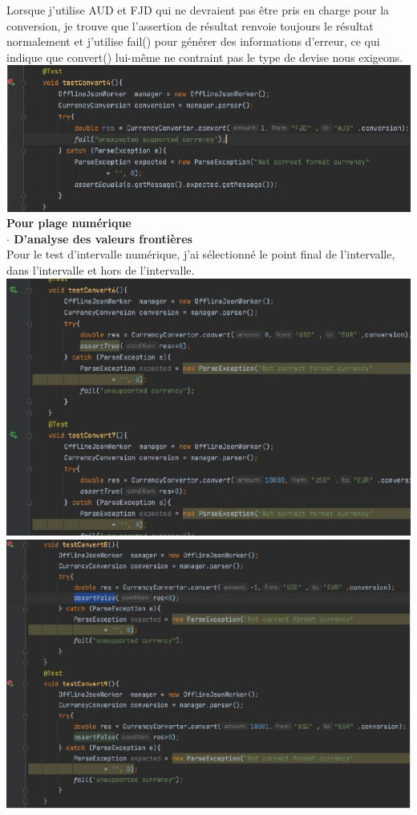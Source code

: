\documentclass{article}
\begin{document}
Lorsque j'utilise AUD et FJD qui ne devraient pas être pris en charge pour la conversion, je trouve que l'assertion de résultat renvoie toujours le résultat normalement et j'utilise fail() pour générer des informations d'erreur, ce qui indique que convert() lui-même ne contraint pas le type de devise nous exigeons.\\
\includegraphics[scale=0.7]{G3.png}\\

\textbf{Pour plage numérique}\\

\textbf{$\cdot$ D’analyse des valeurs frontières}\\

Pour le test d'intervalle numérique, j'ai sélectionné le point final de l'intervalle, dans l'intervalle et hors de l'intervalle.\\
\includegraphics[scale=0.6]{G4.png} \includegraphics[scale=0.65]{G5.png}\\
\end{document}
